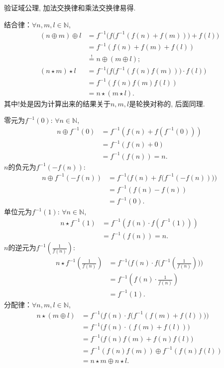 \begin{solution}
    验证域公理, 加法交换律和乘法交换律易得.

    结合律：$\forall n, m, l \in \mathbb{N}$,
\[
\begin{aligned}
    (n \oplus m) \oplus l &= f^{-1}\biggl(f\bigl(f^{-1}(f(n) + f(m))\bigr)+ f(l)\biggr)\\
    &= f^{-1}(f(n) + f(m) + f(l)) \\
    &\overset{!}= n \oplus (m \oplus l);\\
    (n \star m) \star l &= f^{-1}\biggl(f\bigl(f^{-1}(f(n)f(m))\bigr) \cdot f(l)\biggr)\\
    &= f^{-1}(f(n)f(m)f(l)) \\
    &= n \star (m \star l).
\end{aligned}
\]
其中!处是因为计算出来的结果关于$n, m, l$是轮换对称的, 后面同理.

    零元为$f^{-1}(0)$: $\forall n \in \mathbb{N}$,
\[
\begin{aligned}
    n \oplus f^{-1}(0) &= f^{-1}(f(n) + f(f^{-1}(0)))\\
    &= f^{-1}(f(n) + 0)\\
    &= f^{-1}(f(n)) = n.
\end{aligned}
\]
    $n$的负元为$f^{-1}(-f(n))$:
\[
\begin{aligned}
    n \oplus f^{-1}(-f(n)) &= f^{-1}\biggl(f(n) + f\bigl(f^{-1}(-f(n))\bigr)\biggr)\\
    &= f^{-1}(f(n) - f(n))\\
    &= f^{-1}(0).
\end{aligned}
\]
    单位元为$f^{-1}(1)$: $\forall n \in \mathbb{N}$,
\[
\begin{aligned}
    n \star f^{-1}(1) &= f^{-1}(f(n) \cdot f(f^{-1}(1)))\\
    &= f^{-1}(f(n)) = n.
\end{aligned}
\]
    $n$的逆元为$f^{-1}(\frac1{f(n)})$:
\[
\begin{aligned}
    n \star f^{-1}(\frac{1}{f(n)}) &= f^{-1}\biggl(f(n) \cdot f\bigl(f^{-1}(\frac{1}{f(n)})\bigr)\biggr)\\
    &= f^{-1}(f(n) \cdot \frac{1}{f(n)})\\
    &= f^{-1}(1).
\end{aligned}
\]
    分配律：$\forall n, m, l \in \mathbb{N}$,
\[
\begin{aligned}
    n \star (m \oplus l) &= f^{-1}\biggl(f(n) \cdot f\bigl(f^{-1}(f(m) + f(l))\bigr)\biggr)\\
    &= f^{-1}\bigl(f(n) \cdot (f(m) + f(l))\bigr)\\
    &= f^{-1}\bigl(f(n)f(m) + f(n)f(l)\bigr)\\
    &= f^{-1}(f(n)f(m)) \oplus f^{-1}(f(n)f(l))\\
    &= n \star m \oplus n \star l.
\end{aligned}
\]
\end{solution}


